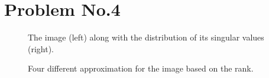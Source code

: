 \section*{Problem No.4} \label{sec:prob4}


\begin{figure}[b]
\centering        
   \caption{ The image (left) along with the distribution of its singular values (right).}
   \label{fig:fig4_ab}
\end{figure}

\begin{figure}[]
\centering        
   \caption{Four different approximation for the image based on the rank. }
   \label{fig:fig4_c}
\end{figure}


